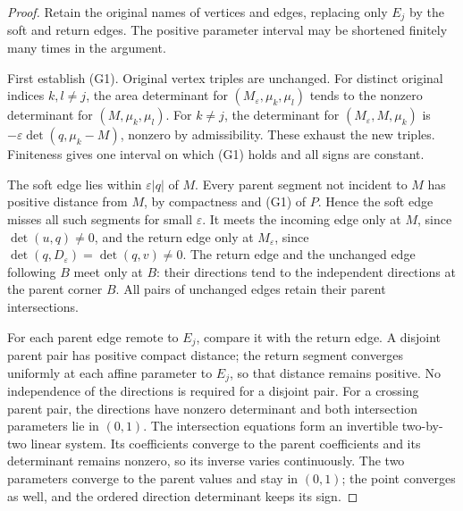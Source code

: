 \begin{proof}
Retain the original names of vertices and edges, replacing only
$E_j$ by the soft and return edges. The positive parameter interval
may be shortened finitely many times in the argument.

First establish (G1). Original vertex triples are unchanged.
For distinct original indices $k,l\ne j$, the area determinant for
$(M_\varepsilon,\mu_k,\mu_l)$ tends to the nonzero determinant
for $(M,\mu_k,\mu_l)$. For $k\ne j$, the determinant for
$(M_\varepsilon,M,\mu_k)$ is
$-\varepsilon\det(q,\mu_k-M)$, nonzero by admissibility.
These exhaust the new triples. Finiteness gives one interval
on which (G1) holds and all signs are constant.

The soft edge lies within $\varepsilon|q|$ of $M$.
Every parent segment not incident to $M$ has positive distance
from $M$, by compactness and (G1) of $P$. Hence the soft edge
misses all such segments for small $\varepsilon$. It meets the
incoming edge only at $M$, since $\det(u,q)\ne0$, and the return
edge only at $M_\varepsilon$, since
$\det(q,D_\varepsilon)=\det(q,v)\ne0$. The return edge and the
unchanged edge following $B$ meet only at $B$: their directions
tend to the independent directions at the parent corner $B$.
All pairs of unchanged edges retain their parent intersections.

For each parent edge remote to $E_j$, compare it with the return
edge. A disjoint parent pair has positive compact distance;
the return segment converges uniformly at each affine parameter
to $E_j$, so that distance remains positive. No independence
of the directions is required for a disjoint pair. For a crossing
parent pair, the directions have nonzero determinant and both
intersection parameters lie in $(0,1)$. The intersection equations
form an invertible two-by-two linear system. Its coefficients
converge to the parent coefficients and its determinant remains
nonzero, so its inverse varies continuously. The two parameters
converge to the parent values and stay in $(0,1)$; the point
converges as well, and the ordered direction determinant keeps
its sign.


\end{proof}
